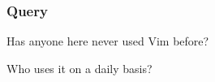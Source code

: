 \begin{frame}[fragile]
  \frametitle{Query}
  \begin{center}
    Has anyone here never used Vim before?
  \end{center}
  \vspace{1cm}
  \begin{center}
    Who uses it on a daily basis?
  \end{center}
\end{frame}
